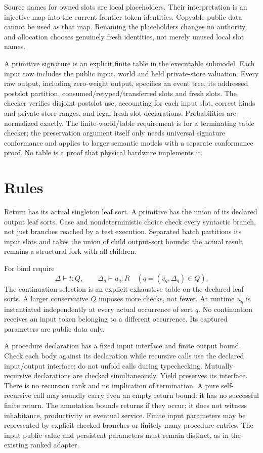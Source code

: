 \documentclass[11pt]{article}
\begin{document}
Source names for owned slots are local placeholders. Their interpretation is an injective map into the current frontier token identities. Copyable public data cannot be used as that map. Renaming the placeholders changes no authority, and allocation chooses genuinely fresh identities, not merely unused local slot names.

A primitive signature is an explicit finite table in the executable submodel. Each input row includes the public input, world and held private-store valuation. Every raw output, including zero-weight output, specifies an event tree, its addressed postslot partition, consumed/retyped/transferred slots and fresh slots. The checker verifies disjoint postslot use, accounting for each input slot, correct kinds and private-store ranges, and legal fresh-slot declarations. Probabilities are normalized exactly. The finite-world/table requirement is for a terminating table checker; the preservation argument itself only needs universal signature conformance and applies to larger semantic models with a separate conformance proof. No table is a proof that physical hardware implements it.

\section{Rules}
Return has its actual singleton leaf sort. A primitive has the union of its declared output leaf sorts. Case and nondeterministic choice check every syntactic branch, not just branches reached by a test execution. Separated batch partitions its input slots and takes the union of child output-sort bounds; the actual result remains a structural fork with all children.

For bind require
\[
 \Delta\vdash t:Q,\qquad
 \Delta_q\vdash u_q:R\quad(q=(v_q,\Delta_q)\in Q).
\]
The continuation selection is an explicit exhaustive table on the declared leaf sorts. A larger conservative $Q$ imposes more checks, not fewer. At runtime $u_q$ is instantiated independently at every actual occurrence of sort $q$. No continuation receives an input token belonging to a different occurrence. Its captured parameters are public data only.

A procedure declaration has a fixed input interface and finite output bound. Check each body against its declaration while recursive calls use the declared input/output interface; do not unfold calls during typechecking. Mutually recursive declarations are checked simultaneously. Yield preserves its interface. There is no recursion rank and no implication of termination. A pure self-recursive call may soundly carry even an empty return bound: it has no successful finite return. The annotation bounds returns if they occur; it does not witness inhabitance, productivity or eventual service. Finite input parameters may be represented by explicit checked branches or finitely many procedure entries. The input public value and persistent parameters must remain distinct, as in the existing ranked adapter.
\end{document}
